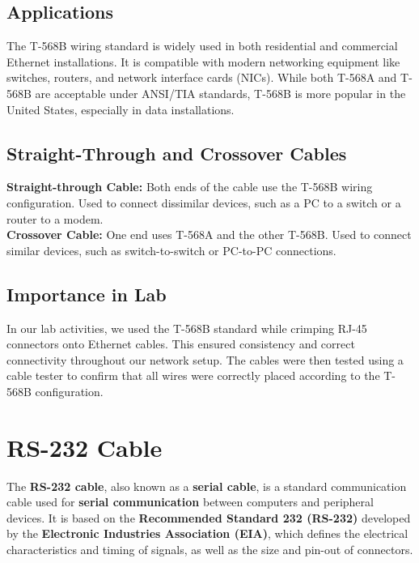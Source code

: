 \documentclass[12pt]{article}
\begin{document}
\subsection{Applications}
The T-568B wiring standard is widely used in both residential and commercial Ethernet installations. It is compatible with modern networking equipment like switches, routers, and network interface cards (NICs). While both T-568A and T-568B are acceptable under ANSI/TIA standards, T-568B is more popular in the United States, especially in data installations.

\subsection{Straight-Through and Crossover Cables}
\textbf{Straight-through Cable:} Both ends of the cable use the T-568B wiring configuration. Used to connect dissimilar devices, such as a PC to a switch or a router to a modem. \\
\textbf{Crossover Cable:} One end uses T-568A and the other T-568B. Used to connect similar devices, such as switch-to-switch or PC-to-PC connections.


\subsection{Importance in Lab}
In our lab activities, we used the T-568B standard while crimping RJ-45 connectors onto Ethernet cables. This ensured consistency and correct connectivity throughout our network setup. The cables were then tested using a cable tester to confirm that all wires were correctly placed according to the T-568B configuration.

\section{RS-232 Cable}

The \textbf{RS-232 cable}, also known as a \textbf{serial cable}, is a standard communication cable used for \textbf{serial communication} between computers and peripheral devices. It is based on the \textbf{Recommended Standard 232 (RS-232)} developed by the \textbf{Electronic Industries Association (EIA)}, which defines the electrical characteristics and timing of signals, as well as the size and pin-out of connectors.
\end{document}
